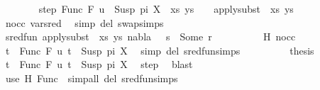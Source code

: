 \begin{isabellebody}
\ \ \ \ \ \ \isamarkupfalse%
\ step{\isacharcolon}{\kern0pt}\ {\isachardoublequoteopen}{\isacharparenleft}{\kern0pt}{\isacharparenleft}{\kern0pt}Func\ F\ u\ {\isasymapprox}{\isacharquery}{\kern0pt}\ Susp\ pi\ X{\isacharparenright}{\kern0pt}\ {\isacharhash}{\kern0pt}\ xs{\isacharcomma}{\kern0pt}\ ys{\isacharparenright}{\kern0pt}\ {\isasymturnstile}\ {\isacharquery}{\kern0pt}{\isasymsigma}\ {\isasymleadsto}\ apply{\isacharunderscore}{\kern0pt}subst\ {\isacharquery}{\kern0pt}{\isasymsigma}\ {\isacharparenleft}{\kern0pt}xs{\isacharcomma}{\kern0pt}\ ys{\isacharparenright}{\kern0pt}{\isachardoublequoteclose}\isanewline
\ \ \ \ \ \ \ \ \isamarkupfalse%
\ nocc\ var{\isacharunderscore}{\kern0pt}{}{\isacharunderscore}{\kern0pt}sred\ \isamarkupfalse%
\ {\isacharparenleft}{\kern0pt}simp\ del{\isacharcolon}{\kern0pt}\ swap{\isachardot}{\kern0pt}simps{\isacharparenright}{\kern0pt}\isanewline
\ \ \ \ \ \ \isamarkupfalse%
\ {\isachardoublequoteopen}sred{\isacharunderscore}{\kern0pt}fun\ {\isacharparenleft}{\kern0pt}apply{\isacharunderscore}{\kern0pt}subst\ {\isacharquery}{\kern0pt}{\isasymsigma}\ {\isacharparenleft}{\kern0pt}xs{\isacharcomma}{\kern0pt}\ ys{\isacharparenright}{\kern0pt}{\isacharcomma}{\kern0pt}\ nabla{\isacharcomma}{\kern0pt}\ {\isacharquery}{\kern0pt}{\isasymsigma}\ {\isasymbullet}\ s{\isacharparenright}{\kern0pt}\ {\isacharequal}{\kern0pt}\ Some\ r{\isachardoublequoteclose}\isanewline
\ \ \ \ \ \ \ \ \isamarkupfalse%
\ H\ nocc\ \isamarkupfalse%
\ {\isacartoucheopen}t{}\ {\isacharequal}{\kern0pt}\ Func\ F\ u{\isacartoucheclose}\ {\isacartoucheopen}t{}\ {\isacharequal}{\kern0pt}\ Susp\ pi\ X{\isacartoucheclose}\ \isamarkupfalse%
\ {\isacharparenleft}{\kern0pt}simp\ del{\isacharcolon}{\kern0pt}\ sred{\isacharunderscore}{\kern0pt}fun{\isachardot}{\kern0pt}simps{\isacharparenright}{\kern0pt}\isanewline
\ \ \ \ \ \ \isamarkupfalse%
\ \isamarkupfalse%
\ {\isacharquery}{\kern0pt}thesis\ \isamarkupfalse%
\ {\isacartoucheopen}t{}\ {\isacharequal}{\kern0pt}\ Func\ F\ u{\isacartoucheclose}\ {\isacartoucheopen}t{}\ {\isacharequal}{\kern0pt}\ Susp\ pi\ X{\isacartoucheclose}\ \isamarkupfalse%
\ step\ \isamarkupfalse%
\ blast\isanewline
\ \ \ \ \isamarkupfalse%
\ {\isacharparenleft}{\kern0pt}use\ H\ Func\ \ {\isacartoucheopen}simp{\isacharunderscore}{\kern0pt}all\ del{\isacharcolon}{\kern0pt}\ sred{\isacharunderscore}{\kern0pt}fun{\isachardot}{\kern0pt}simps{\isacartoucheclose}{\isacharparenright}{\kern0pt}\isanewline

\end{isabellebody}
